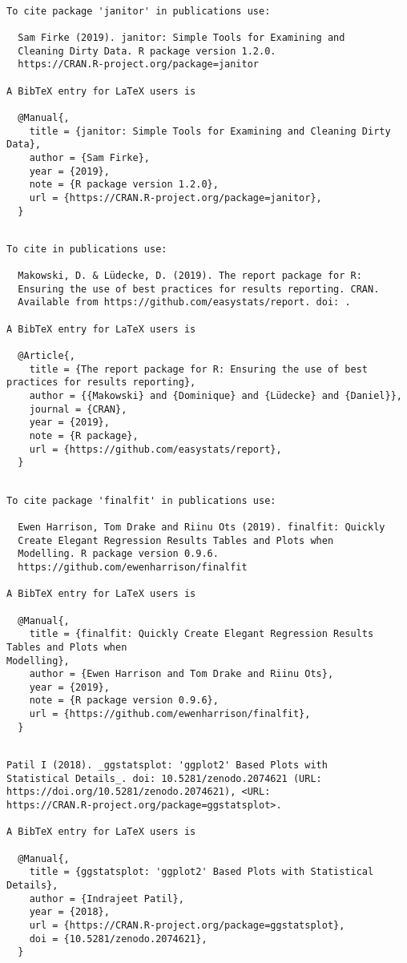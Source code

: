 \documentclass[]{article}
\begin{document}
\begin{verbatim}

To cite package 'janitor' in publications use:

  Sam Firke (2019). janitor: Simple Tools for Examining and
  Cleaning Dirty Data. R package version 1.2.0.
  https://CRAN.R-project.org/package=janitor

A BibTeX entry for LaTeX users is

  @Manual{,
    title = {janitor: Simple Tools for Examining and Cleaning Dirty Data},
    author = {Sam Firke},
    year = {2019},
    note = {R package version 1.2.0},
    url = {https://CRAN.R-project.org/package=janitor},
  }
\end{verbatim}

\begin{verbatim}

To cite in publications use:

  Makowski, D. & Lüdecke, D. (2019). The report package for R:
  Ensuring the use of best practices for results reporting. CRAN.
  Available from https://github.com/easystats/report. doi: .

A BibTeX entry for LaTeX users is

  @Article{,
    title = {The report package for R: Ensuring the use of best practices for results reporting},
    author = {{Makowski} and {Dominique} and {Lüdecke} and {Daniel}},
    journal = {CRAN},
    year = {2019},
    note = {R package},
    url = {https://github.com/easystats/report},
  }
\end{verbatim}

\begin{verbatim}

To cite package 'finalfit' in publications use:

  Ewen Harrison, Tom Drake and Riinu Ots (2019). finalfit: Quickly
  Create Elegant Regression Results Tables and Plots when
  Modelling. R package version 0.9.6.
  https://github.com/ewenharrison/finalfit

A BibTeX entry for LaTeX users is

  @Manual{,
    title = {finalfit: Quickly Create Elegant Regression Results Tables and Plots when
Modelling},
    author = {Ewen Harrison and Tom Drake and Riinu Ots},
    year = {2019},
    note = {R package version 0.9.6},
    url = {https://github.com/ewenharrison/finalfit},
  }
\end{verbatim}

\begin{verbatim}

Patil I (2018). _ggstatsplot: 'ggplot2' Based Plots with
Statistical Details_. doi: 10.5281/zenodo.2074621 (URL:
https://doi.org/10.5281/zenodo.2074621), <URL:
https://CRAN.R-project.org/package=ggstatsplot>.

A BibTeX entry for LaTeX users is

  @Manual{,
    title = {ggstatsplot: 'ggplot2' Based Plots with Statistical Details},
    author = {Indrajeet Patil},
    year = {2018},
    url = {https://CRAN.R-project.org/package=ggstatsplot},
    doi = {10.5281/zenodo.2074621},
  }
\end{verbatim}
\end{document}
